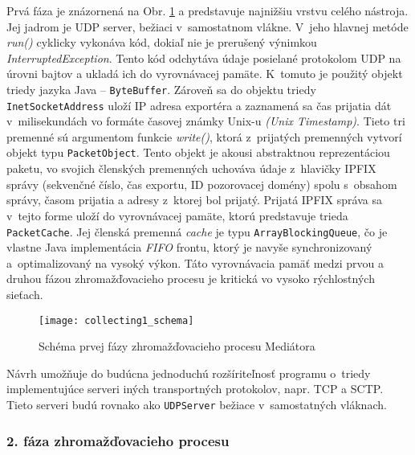 Prvá fáza je znázornená na Obr. \ref{o:collecting1_schema} a predstavuje najnižšiu vrstvu celého 
nástroja. Jej jadrom je UDP server, bežiaci v~samostatnom vlákne. V~jeho hlavnej metóde \emph{run()}
cyklicky vykonáva kód, dokiaľ nie je prerušený výnimkou \emph{InterruptedException}.
Tento kód odchytáva údaje posielané protokolom UDP na úrovni bajtov a ukladá ich do 
vyrovnávacej pamäte. K~tomuto je použitý objekt triedy jazyka Java -- \verb|ByteBuffer|. Zároveň sa do 
objektu triedy \verb|InetSocketAddress| uloží IP adresa exportéra a zaznamená sa čas prijatia dát
v~milisekundách vo formáte časovej známky Unix-u \emph{(Unix Timestamp)}. Tieto tri premenné sú argumentom 
funkcie \emph{write()}, 
ktorá z~prijatých premenných vytvorí objekt typu \verb|PacketObject|. Tento objekt je akousi
abstraktnou reprezentáciou paketu, vo svojich členských premenných uchováva údaje z~hlavičky
IPFIX správy (sekvenčné číslo, čas exportu, ID pozorovacej domény) spolu s~obsahom správy, časom 
prijatia a adresy z~ktorej bol prijatý. Prijatá IPFIX správa sa v~tejto forme uloží do vyrovnávacej 
pamäte, ktorú predstavuje trieda \verb|PacketCache|. Jej členská 
premenná \emph{cache} je typu \verb|ArrayBlockingQueue|, čo je vlastne Java implementácia \emph{FIFO}
frontu, ktorý je navyše synchronizovaný a~optimalizovaný na vysoký výkon. Táto vyrovnávacia pamäť 
medzi prvou a druhou fázou zhromažďovacieho procesu je kritická vo vysoko rýchlostných sieťach. 

\begin{figure}[ht!]
\centering
\texttt{[image: collecting1\_schema]}
\caption{Schéma prvej fázy zhromažďovacieho procesu Mediátora}\label{o:collecting1_schema}
\end{figure}

Návrh umožňuje do budúcna jednoduchú rozšíriteľnosť programu o~triedy implementujúce serveri iných transportných 
protokolov, napr. TCP a SCTP. Tieto serveri budú rovnako ako \verb|UDPServer| bežiace v~samostatných 
vláknach.

\subsubsection{2. fáza zhromažďovacieho procesu}

